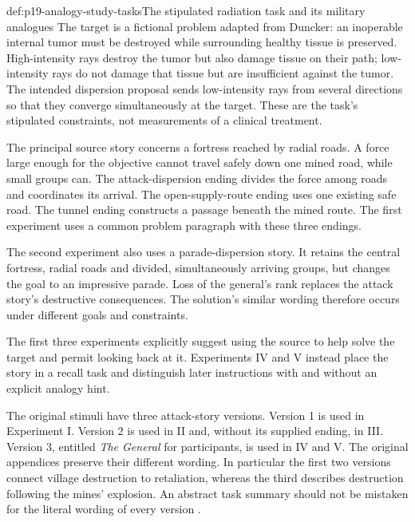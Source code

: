 \begin{hbdefinition}{def:p19-analogy-study-tasks}{The stipulated radiation task and its military analogues}
The target is a fictional problem adapted from Duncker: an
inoperable internal tumor must be destroyed while surrounding
healthy tissue is preserved. High-intensity rays destroy the
tumor but also damage tissue on their path; low-intensity rays
do not damage that tissue but are insufficient against the
tumor. The intended dispersion proposal sends low-intensity
rays from several directions so that they converge simultaneously
at the target. These are the task's stipulated constraints,
not measurements of a clinical treatment.

The principal source story concerns a fortress reached by
radial roads. A force large enough for the objective cannot
travel safely down one mined road, while small groups can.
The attack-dispersion ending divides the force among roads
and coordinates its arrival. The open-supply-route ending
uses one existing safe road. The tunnel ending constructs
a passage beneath the mined route. The first experiment
uses a common problem paragraph with these three endings.

The second experiment also uses a parade-dispersion story.
It retains the central fortress, radial roads and divided,
simultaneously arriving groups, but changes the goal to
an impressive parade. Loss of the general's rank replaces
the attack story's destructive consequences. The solution's
similar wording therefore occurs under different goals
and constraints.

The first three experiments explicitly suggest using the
source to help solve the target and permit looking back
at it. Experiments IV and V instead place the story in
a recall task and distinguish later instructions with
and without an explicit analogy hint.
\end{hbdefinition}

The original stimuli have three attack-story versions.
Version 1 is used in Experiment I. Version 2 is used
in II and, without its supplied ending, in III.
Version 3, entitled \emph{The General} for participants,
is used in IV and V. The original appendices preserve
their different wording. In particular the first two
versions connect village destruction to retaliation,
whereas the third describes destruction following the
mines' explosion. An abstract task summary should not
be mistaken for the literal wording of every version
\cite[pp.~351--354, appendices~I--IV]{GickHolyoak1980AnalogicalProblemSolving}.

